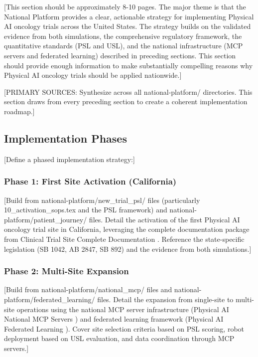 
[This section should be approximately 8-10 pages. The major theme is that the
National Platform provides a clear, actionable strategy for implementing
Physical AI oncology trials across the United States. The strategy builds on
the validated evidence from both simulations, the comprehensive regulatory
framework, the quantitative standards (PSL and USL), and the national
infrastructure (MCP servers and federated learning) described in preceding
sections. This section should provide enough information to make substantially
compelling reasons why Physical AI oncology trials should be applied
nationwide.]

[PRIMARY SOURCES: Synthesize across all national-platform/ directories.
This section draws from every preceding section to create a coherent
implementation roadmap.]

\subsection{Implementation Phases}
\label{subsec:impl-phases}

[Define a phased implementation strategy:]

\subsubsection{Phase 1: First Site Activation (California)}
[Build from national-platform/new\_trial\_psl/ files (particularly
10\_activation\_sops.tex and the PSL framework) and
national-platform/patient\_journey/ files. Detail the activation of the first
Physical AI oncology trial site in California, leveraging the complete
documentation package from Clinical Trial Site Complete Documentation
\cite{site-docs}. Reference the state-specific legislation (SB 1042, AB 2847,
SB 892) and the evidence from both simulations.]

\subsubsection{Phase 2: Multi-Site Expansion}
[Build from national-platform/national\_mcp/ files and
national-platform/federated\_learning/ files. Detail the expansion from
single-site to multi-site operations using the national MCP server
infrastructure (Physical AI National MCP Servers \cite{national-mcp-paper})
and federated learning framework (Physical AI Federated Learning
\cite{fl-paper}). Cover site selection criteria based on PSL scoring,
robot deployment based on USL evaluation, and data coordination through
MCP servers.]

